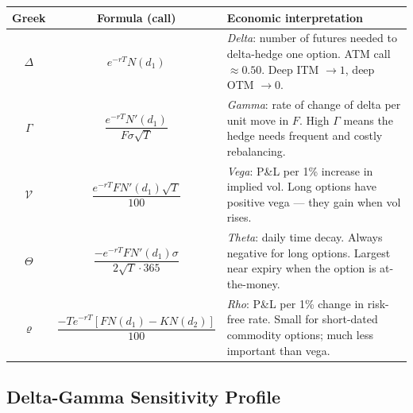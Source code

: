 \documentclass[11pt,a4paper]{article}
\renewcommand{\arraystretch}{1}
\renewcommand{\arraystretch}{1}
\renewcommand{\arraystretch}{1.45}
\begin{document}
{\renewcommand{\arraystretch}{3.0}
\begin{center}
\begin{tabularx}{\textwidth}{c c X}
\toprule
\textbf{Greek} & \textbf{Formula (call)} & \textbf{Economic interpretation} \\
\midrule
$\Delta$ &
  $\displaystyle e^{-rT}N(d_1)$ &
  \textit{Delta}: number of futures needed to delta-hedge one option.
  ATM call $\approx 0.50$. Deep ITM $\to 1$, deep OTM $\to 0$. \\
$\Gamma$ &
  $\displaystyle\dfrac{e^{-rT}N'(d_1)}{F\sigma\sqrt{T}}$ &
  \textit{Gamma}: rate of change of delta per unit move in $F$.
  High $\Gamma$ means the hedge needs frequent and costly rebalancing. \\
$\mathcal{V}$ &
  $\displaystyle\dfrac{e^{-rT}F N'(d_1)\sqrt{T}}{100}$ &
  \textit{Vega}: P\&L per 1\% increase in implied vol.
  Long options have positive vega --- they gain when vol rises. \\
$\Theta$ &
  $\displaystyle\dfrac{-e^{-rT}F N'(d_1)\sigma}{2\sqrt{T}\cdot365}$ &
  \textit{Theta}: daily time decay. Always negative for long options.
  Largest near expiry when the option is at-the-money. \\
$\varrho$ &
  $\displaystyle\dfrac{-Te^{-rT}[FN(d_1)-KN(d_2)]}{100}$ &
  \textit{Rho}: P\&L per 1\% change in risk-free rate.
  Small for short-dated commodity options; much less important than vega. \\
\bottomrule
\end{tabularx}
\end{center}}

\subsection{Delta-Gamma Sensitivity Profile}
\end{document}
